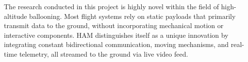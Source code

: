 The research conducted in this project is highly novel within the field of high-altitude ballooning. Most flight systems rely on static payloads that primarily transmit data to the ground, without incorporating mechanical motion or interactive components. HAM distinguishes itself as a unique innovation by integrating constant bidirectional communication, moving mechanisms, and real-time telemetry, all streamed to the ground via live video feed. \par